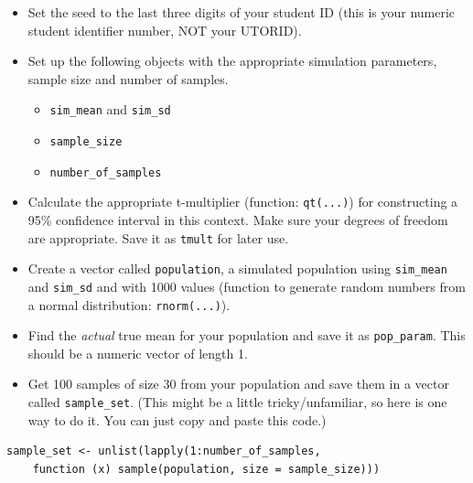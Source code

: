\documentclass[
  openany]{book}
\begin{document}
\begin{itemize}
\item
  Set the seed to the last three digits of your student ID (this is your numeric student identifier number, NOT your UTORID).
\item
  Set up the following objects with the appropriate simulation parameters, sample size and number of samples.

  \begin{itemize}
  \item
    \texttt{sim\_mean} and \texttt{sim\_sd}
  \item
    \texttt{sample\_size}
  \item
    \texttt{number\_of\_samples}
  \end{itemize}
\item
  Calculate the appropriate t-multiplier (function: \texttt{qt(...)}) for constructing a 95\% confidence interval in this context. Make sure your degrees of freedom are appropriate. Save it as \texttt{tmult} for later use.
\item
  Create a vector called \texttt{population}, a simulated population using \texttt{sim\_mean} and \texttt{sim\_sd} and with 1000 values (function to generate random numbers from a normal distribution: \texttt{rnorm(...)}).
\item
  Find the \emph{actual} true mean for your population and save it as \texttt{pop\_param}. This should be a numeric vector of length 1.
\item
  Get 100 samples of size 30 from your population and save them in a vector called \texttt{sample\_set}. (This might be a little tricky/unfamiliar, so here is one way to do it. You can just copy and paste this code.)
\end{itemize}

\begin{verbatim}
sample_set <- unlist(lapply(1:number_of_samples,
    function (x) sample(population, size = sample_size)))
\end{verbatim}
\end{document}
